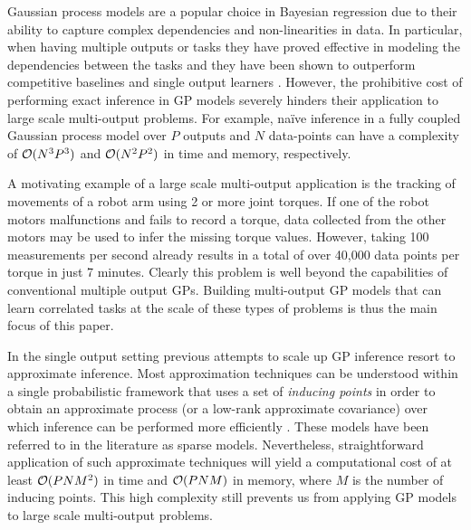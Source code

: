 Gaussian process models  \citep[GPs,][]{rasmussen-williams-book}  are a popular choice in 
Bayesian regression due to their ability to capture complex dependencies and non-linearities in data.
In particular, when having multiple outputs or tasks they have proved effective in modeling 
the dependencies between the tasks  and  they have been shown to outperform competitive baselines and 
single output learners  \citep{bonilla-et-al-nips-08,teh-et-al-aistats-05,alvarez-lawrence-nips-08,wilson-et-al-icml-12}.
However, the prohibitive cost of performing exact inference in  GP models severely hinders 
their application to  large scale multi-output problems. For example, na\"{i}ve inference 
in a fully coupled Gaussian process model over $P$  outputs and $N$ data-points can have 
a complexity of $\mathcal{O}(N^3P^3)$  and $\mathcal{O}(N^2P^2)$ in time and memory, respectively.


A motivating  example of a large scale multi-output application 
is the tracking of  movements of a robot arm using 2 or more joint torques. 
If one of the robot motors malfunctions and fails to record a torque, data collected from the 
other motors may be used to infer the missing torque values.
However, taking 100 measurements per second already results in a total of over 40,000 data points 
per torque in just 7 minutes.
Clearly this problem is well beyond the capabilities  of conventional multiple output GPs.
Building  multi-output GP models that can learn correlated tasks at the scale of 
these types of problems  is thus the main focus of this paper.

In the single output setting previous attempts to scale up  GP inference 
resort to approximate inference. Most  approximation techniques 
 can be understood 
within a single probabilistic framework that uses a set of \emph{inducing points}  in order to 
obtain an approximate process (or a low-rank approximate covariance) over which inference can be 
performed more efficiently \citep{quinonero2005unifying}. These models have been referred 
to in the literature as sparse models. 
Nevertheless, straightforward application of such approximate techniques will yield a computational 
cost of at least $\mathcal{O}(PNM^2)$ in time and  $\mathcal{O}(PNM)$ in memory, where 
$M$ is the number of inducing points. This high complexity still prevents us from applying GP models 
to  large scale multi-output problems.

